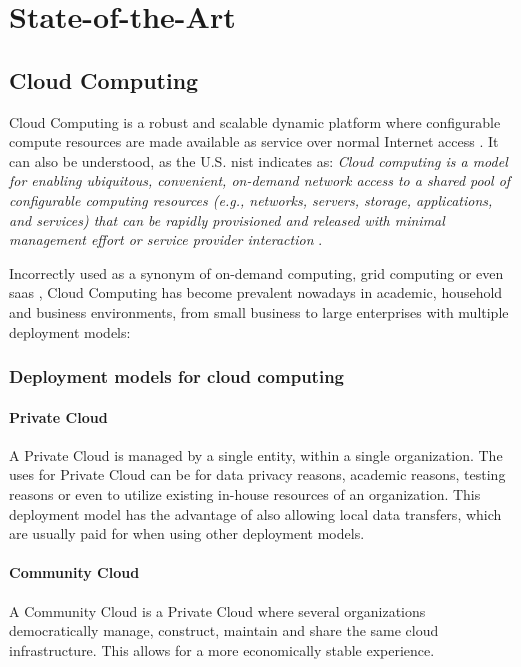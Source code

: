 \chapter{State-of-the-Art}\label{state-of-the-art}

\section{Cloud Computing}\label{state-of-the-art:s:cloud-computing}

Cloud Computing is a robust and scalable dynamic platform where configurable compute resources are made available as service over normal Internet access \Parencite{alnumay_2020}.
It can also be understood, as the U.S. \gls{nist} indicates as:
\textit{Cloud computing is a model for enabling ubiquitous, convenient, on-demand network access to a shared pool of configurable computing resources (e.g., networks, servers, storage, applications, and services) that can be rapidly provisioned and released with minimal management effort or service provider interaction} \Parencite{mell_grance_2011}. 

Incorrectly used as a synonym of on-demand computing, grid computing or even \gls{saas} \Parencite{kim_2009}, Cloud Computing has become prevalent nowadays in academic, household and business environments, from small business to large enterprises \parencite{rezaei_chiew_lee_shams_aliee_2014} with multiple deployment models:

\subsection{Deployment models for cloud computing}\label{state-of-the-art:ss:deployment-models-for-cloud-computing}

\subsubsection{Private Cloud}\label{state-of-the-art:sss:private-cloud}
A Private Cloud is managed by a single entity, within a single organization. The uses for Private Cloud can be for data privacy reasons, academic reasons, testing reasons or even to utilize existing in-house resources of an organization. This deployment model has the advantage of also allowing local data transfers, which are usually paid for when using other deployment models.

\subsubsection{Community Cloud}\label{state-of-the-art:sss:community-cloud}
A Community Cloud is a Private Cloud where several organizations democratically manage, construct, maintain and share the same cloud infrastructure. This allows for a more economically stable experience.

